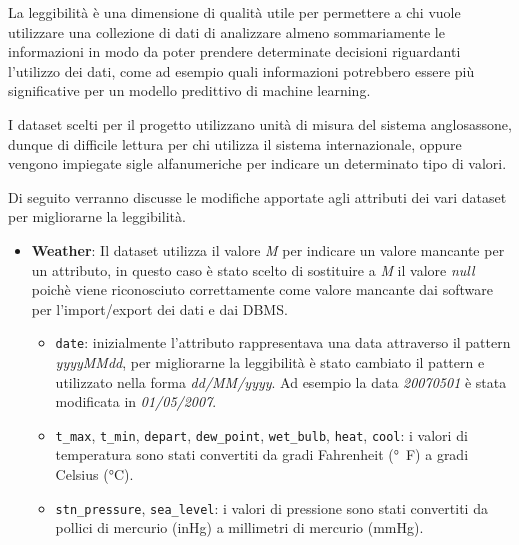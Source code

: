 La leggibilità è una dimensione di qualità utile per permettere a chi vuole 
utilizzare una collezione di dati di analizzare almeno sommariamente le 
informazioni in modo da poter prendere determinate decisioni riguardanti 
l'utilizzo dei dati, come ad esempio quali informazioni potrebbero essere più 
significative per un modello predittivo di machine learning.

I dataset scelti per il progetto utilizzano unità di misura del sistema 
anglosassone, dunque di difficile lettura per chi utilizza il sistema 
internazionale, oppure vengono impiegate sigle alfanumeriche per indicare un 
determinato tipo di valori. 

Di seguito verranno discusse le modifiche apportate agli attributi dei vari 
dataset per migliorarne la leggibilità.

\begin{itemize}

    \item \textbf{Weather}: Il dataset utilizza il valore \textit{M} per 
        indicare un valore mancante per un attributo, in questo caso è stato 
        scelto di sostituire a \textit{M} il valore \textit{null} poichè viene 
        riconosciuto correttamente come valore mancante dai software per 
        l'import/export dei dati e dai DBMS.
        
        \begin{itemize}
            
            \item \texttt{date}: inizialmente l'attributo rappresentava una 
                data attraverso il pattern \textit{yyyyMMdd}, per migliorarne 
                la leggibilità è stato cambiato il pattern e utilizzato nella 
                forma \textit{dd/MM/yyyy}. Ad esempio la data 
                \textit{20070501} è stata modificata in \textit{01/05/2007}.
        
            \item \texttt{t\_max}, \texttt{t\_min}, \texttt{depart}, 
            	\texttt{dew\_point}, \texttt{wet\_bulb}, \texttt{heat}, 
            	\texttt{cool}: i valori di temperatura sono stati convertiti da 
            	gradi Fahrenheit (\si{\degree F}) a gradi Celsius 
            	(\si{\celsius}).

            \item \texttt{stn\_pressure}, \texttt{sea\_level}: i valori di 
                pressione sono stati convertiti da pollici di mercurio (inHg) a 
                millimetri di mercurio (mmHg).


\end{itemize}
\end{itemize}
